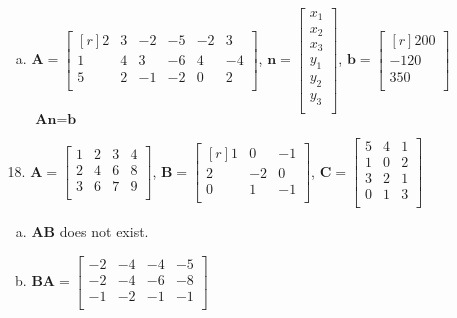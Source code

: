 \documentclass[letterpaper,fleqn]{article}
\begin{document}
\begin{enumerate}
\begin{enumerate}
\begin{enumerate}[(a)]
				\item
				$\textbf{A}=\begin{bmatrix*}[r]
					2 & 3 & -2 & -5 & -2 & 3 \\
					1 & 4 & 3 & -6 & 4 & -4 \\
					5 & 2 & -1 & -2 & 0 & 2 \\
				\end{bmatrix*}$, $\textbf{n}=\begin{bmatrix*}
					x_1 \\
					x_2 \\
					x_3 \\
					y_1 \\
					y_2 \\
					y_3 \\
				\end{bmatrix*}$, $\textbf{b}=\begin{bmatrix*}[r]
					200 \\
					-120 \\
					350 \\
				\end{bmatrix*}$ \\
				$\textbf{An}=\textbf{b}$ \\
			\end{enumerate}
			
			\item [18.]
			$\textbf{A}=\begin{bmatrix*}
				1 & 2 & 3 & 4 \\
				2 & 4 & 6 & 8 \\
				3 & 6 & 7 & 9 \\
			\end{bmatrix*}$, $\textbf{B}=\begin{bmatrix*}[r]
				1 & 0 & -1 \\
				2 & -2 & 0 \\
				0 & 1 & -1 \\
			\end{bmatrix*}$, $\textbf{C}=\begin{bmatrix*}
				5 & 4 & 1 \\
				1 & 0 & 2 \\
				3 & 2 & 1 \\
				0 & 1 & 3 \\
			\end{bmatrix*}$
			\begin{enumerate}[(a)]
				\item \textbf{AB} does not exist.
				
				\item $\textbf{BA}=\begin{bmatrix*}
					-2 & -4 & -4 & -5 \\
					-2 & -4 & -6 & -8 \\
					-1 & -2 & -1 & -1 \\
				\end{bmatrix*}$
				

\end{enumerate}
\end{enumerate}
\end{enumerate}
\end{document}
